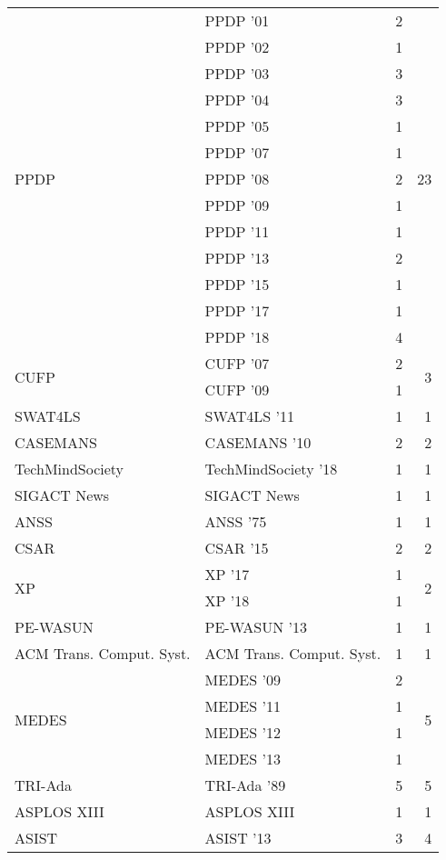 \begin{table*}[t]
\begin{tabular}{llrr}
\multirow{13}{*}{PPDP } & PPDP '01 & 2 & \multirow{13}{*}{23}\\
& PPDP '02 & 1 &\\
& PPDP '03 & 3 &\\
& PPDP '04 & 3 &\\
& PPDP '05 & 1 &\\
& PPDP '07 & 1 &\\
& PPDP '08 & 2 &\\
& PPDP '09 & 1 &\\
& PPDP '11 & 1 &\\
& PPDP '13 & 2 &\\
& PPDP '15 & 1 &\\
& PPDP '17 & 1 &\\
& PPDP '18 & 4 &\\
\multirow{2}{*}{CUFP } & CUFP '07 & 2 & \multirow{2}{*}{3}\\
& CUFP '09 & 1 &\\
\multirow{1}{*}{SWAT4LS } & SWAT4LS '11 & 1 & \multirow{1}{*}{1}\\
\multirow{1}{*}{CASEMANS } & CASEMANS '10 & 2 & \multirow{1}{*}{2}\\
\multirow{1}{*}{TechMindSociety } & TechMindSociety '18 & 1 & \multirow{1}{*}{1}\\
\multirow{1}{*}{SIGACT News} & SIGACT News & 1 & \multirow{1}{*}{1}\\
\multirow{1}{*}{ANSS } & ANSS '75 & 1 & \multirow{1}{*}{1}\\
\multirow{1}{*}{CSAR } & CSAR '15 & 2 & \multirow{1}{*}{2}\\
\multirow{2}{*}{XP } & XP '17 & 1 & \multirow{2}{*}{2}\\
& XP '18 & 1 &\\
\multirow{1}{*}{PE-WASUN } & PE-WASUN '13 & 1 & \multirow{1}{*}{1}\\
\multirow{1}{*}{ACM Trans. Comput. Syst.} & ACM Trans. Comput. Syst. & 1 & \multirow{1}{*}{1}\\
\multirow{4}{*}{MEDES } & MEDES '09 & 2 & \multirow{4}{*}{5}\\
& MEDES '11 & 1 &\\
& MEDES '12 & 1 &\\
& MEDES '13 & 1 &\\
\multirow{1}{*}{TRI-Ada } & TRI-Ada '89 & 5 & \multirow{1}{*}{5}\\
\multirow{1}{*}{ASPLOS XIII} & ASPLOS XIII & 1 & \multirow{1}{*}{1}\\
\multirow{2}{*}{ASIST } & ASIST '13 & 3 & \multirow{2}{*}{4}\\

\end{tabular}
\end{table*}
